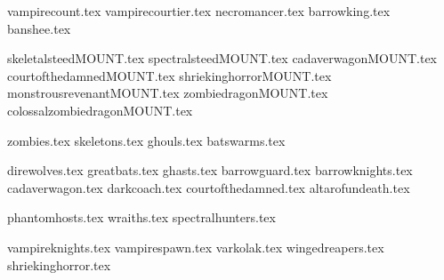 
\toggletrue{twocellsRsr}

{vampirecount.tex}
{vampirecourtier.tex}
{necromancer.tex}
{barrowking.tex}
{banshee.tex}

\clearpage
{}
{skeletalsteedMOUNT.tex}
{spectralsteedMOUNT.tex}
{cadaverwagonMOUNT.tex}
{courtofthedamnedMOUNT.tex}
{shriekinghorrorMOUNT.tex}
{monstrousrevenantMOUNT.tex}
{zombiedragonMOUNT.tex}
{colossalzombiedragonMOUNT.tex}

\clearpage
{}
{zombies.tex}
{skeletons.tex}
{ghouls.tex}
{batswarms.tex}

\clearpage
{}
{direwolves.tex}
{greatbats.tex}
{ghasts.tex}
{barrowguard.tex}
{barrowknights.tex}
{cadaverwagon.tex}
{darkcoach.tex}
{courtofthedamned.tex}
{altarofundeath.tex}

\clearpage
{}
{phantomhosts.tex}
{wraiths.tex}
{spectralhunters.tex}

\clearpage
{}
{vampireknights.tex}
{vampirespawn.tex}
{varkolak.tex}
{wingedreapers.tex}
{shriekinghorror.tex}
